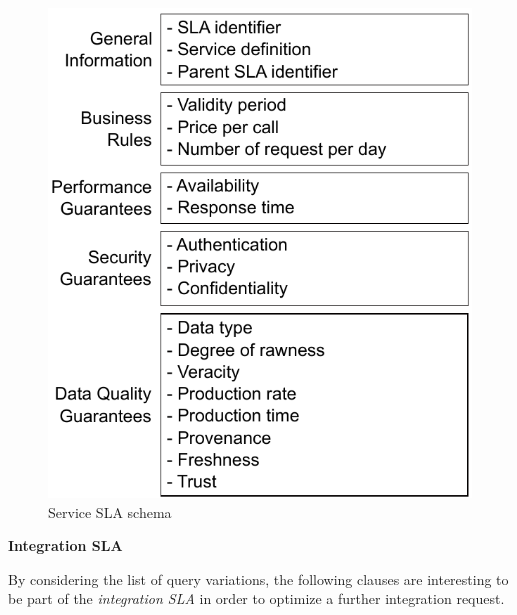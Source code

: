\documentclass[12pt,a4paper,oneside]{article}
\theoremstyle{definition}
\begin{document}
\begin{figure}[h!]
\center
\includegraphics[scale=1]{figures/Service-SLA-Schema.pdf}\caption{Service SLA schema}\label{fig:servicesla}
\end{figure}


\begin{flushleft}
\textbf{Integration SLA}
\end{flushleft}

By considering the list of query variations, the following clauses are interesting to be part of the \textsl{integration SLA} in order to optimize a further integration request. 
\end{document}
